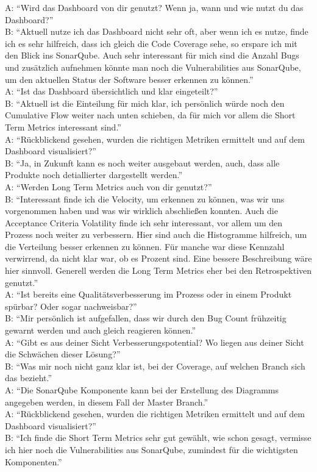 A\@: ``Wird das Dashboard von dir genutzt? Wenn ja, wann und wie nutzt du das Dashboard?'' \\
B\@: ``Aktuell nutze ich das Dashboard nicht sehr oft, aber wenn ich es nutze, finde ich es sehr hilfreich, dass ich gleich die Code Coverage sehe, so erspare ich mit den Blick ins SonarQube. Auch sehr interessant für mich sind die Anzahl Bugs und zusätzlich aufnehmen könnte man noch die Vulnerabilities aus SonarQube, um den aktuellen Status der Software besser erkennen zu können.'' \\
A\@: ``Ist das Dashboard übersichtlich und klar eingeteilt?'' \\
B\@: ``Aktuell ist die Einteilung für mich klar, ich persönlich würde noch den Cumulative Flow weiter nach unten schieben, da für mich vor allem die Short Term Metrics interessant sind.'' \\
A\@: ``Rückblickend gesehen, wurden die richtigen Metriken ermittelt und auf dem Dashboard visualisiert?'' \\
B\@: ``Ja, in Zukunft kann es noch weiter ausgebaut werden, auch, dass alle Produkte noch detiallierter dargestellt werden.'' \\
A\@: ``Werden Long Term Metrics auch von dir genutzt?'' \\
B\@: ``Interessant finde ich die Velocity, um erkennen zu können, was wir uns vorgenommen haben und was wir wirklich abschließen konnten. Auch die Acceptance Criteria Volatility finde ich sehr interessant, vor allem um den Prozess noch weiter zu verbessern. Hier sind auch die Histogramme hilfreich, um die Verteilung besser erkennen zu können. Für manche war diese Kennzahl verwirrend, da nicht klar war, ob es Prozent sind. Eine bessere Beschreibung wäre hier sinnvoll. Generell werden die Long Term Metrics eher bei den Retrospektiven genutzt.'' \\
A\@: ``Ist bereits eine Qualitätsverbesserung im Prozess oder in einem Produkt spürbar? Oder sogar nachweisbar?'' \\
B\@: ``Mir persönlich ist aufgefallen, dass wir durch den Bug Count frühzeitig gewarnt werden und auch gleich reagieren können.'' \\
A\@: ``Gibt es aus deiner Sicht Verbesserungspotential? Wo liegen aus deiner Sicht die Schwächen dieser Lösung?'' \\
B\@: ``Was mir noch nicht ganz klar ist, bei der Coverage, auf welchen Branch sich das bezieht.'' \\
A\@: ``Die SonarQube Komponente kann bei der Erstellung des Diagramms angegeben werden, in diesem Fall der Master Branch.'' \\
A\@: ``Rückblickend gesehen, wurden die richtigen Metriken ermittelt und auf dem Dashboard visualisiert?'' \\
B\@: ``Ich finde die Short Term Metrics sehr gut gewählt, wie schon gesagt, vermisse ich hier noch die Vulnerabilities aus SonarQube, zumindest für die wichtigsten Komponenten.''
